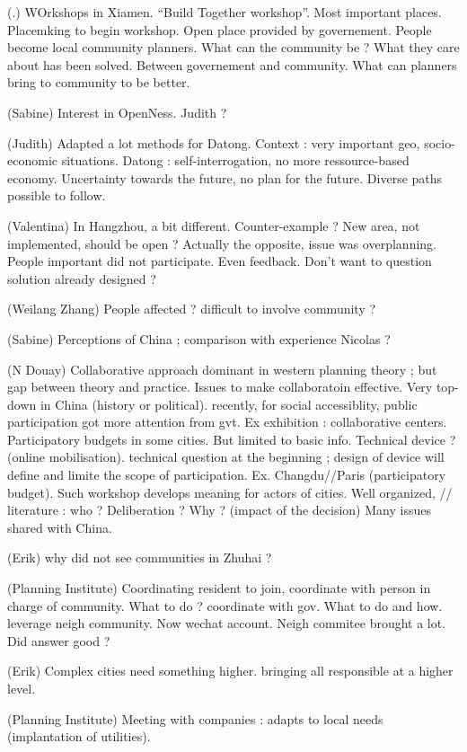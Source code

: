 \documentclass[11pt]{article}
\begin{document}
(.) WOrkshops in Xiamen. ``Build Together workshop''. Most important places.  Placemking to begin workshop. Open place provided by governement. People become local community planners. What can the community be ? What they care about has been solved. Between governement and community. What can planners bring to community to be better.

(Sabine) Interest in OpenNess. Judith ?

(Judith) Adapted a lot methods for Datong. Context : very important geo, socio-economic situations. Datong : self-interrogation, no more ressource-based economy. Uncertainty towards the future, no plan for the future. Diverse paths possible to follow. 

(Valentina) In Hangzhou, a bit different. Counter-example ? New area, not implemented, should be open ? Actually the opposite, issue was overplanning. People important did not participate. Even feedback. Don't want to question solution already designed ?

(Weilang Zhang) People affected ? difficult to involve community ?

(Sabine) Perceptions of China ; comparison with experience Nicolas ?

(N Douay) Collaborative approach dominant in western planning theory ; but gap between theory and practice. Issues to make collaboratoin effective. Very top-down in China (history or political). recently, for social accessiblity, public participation got more attention from gvt. Ex exhibition : collaborative centers. Participatory budgets in some cities. But limited to basic info. Technical device ? (online mobilisation). technical question at the beginning ; design of device will define and limite the scope of participation. Ex. Changdu//Paris (participatory budget). Such workshop develops meaning for actors of cities. Well organized, // literature : who ? Deliberation ? Why ? (impact of the decision) Many issues shared with China.

(Erik) why did not see communities in Zhuhai ? 

(Planning Institute) Coordinating resident to join, coordinate with person in charge of community. What to do ? coordinate with gov. What to do and how. leverage neigh community. Now wechat account. Neigh commitee brought a lot. Did answer good ?

(Erik) Complex cities need something higher. bringing all responsible at a higher level.

(Planning Institute) Meeting with companies : adapts to local needs (implantation of utilities).
\end{document}
